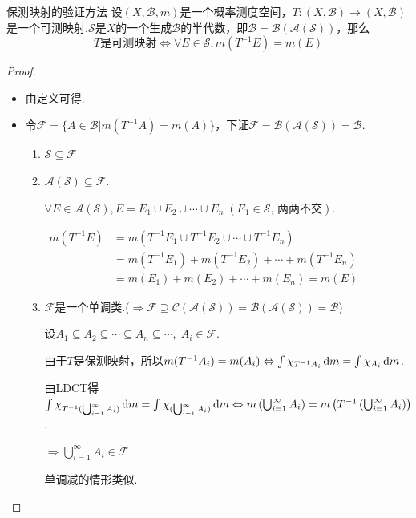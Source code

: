 \begin{theorem}{保测映射的验证方法}
    设$(X,\mathcal{B},m)$是一个概率测度空间，$T:(X,\mathcal{B}) \to (X,\mathcal{B})$是一个可测映射.$\mathcal{S}$是$X$的一个生成$\mathcal{B}$的半代数，即$\mathcal{B}=\mathcal{B}(\mathcal{A}(\mathcal{S}))$，那么
    \[ T\text{是可测映射} \Longleftrightarrow \forall E \in \mathcal{S},m(T^{-1}E) = m(E) \]
\end{theorem}
\begin{proof}
    \begin{itemize}[leftmargin = 3.5em]
        \item[“$\Rightarrow$”] 由定义可得.
        \item[“$\Leftarrow$”] 令$\mathcal{F} = \{A\in\mathcal{B}|m(T^{-1}A)=m(A)\}$，下证$\mathcal{F}=\mathcal{B}(\mathcal{A}(\mathcal{S}))=\mathcal{B}$.\par
        \begin{enumerate}[leftmargin=0em,label=(\roman*)]
            \item $\mathcal{S}\subseteq\mathcal{F}$
            \item $\mathcal{A}(\mathcal{S})\subseteq\mathcal{F}$.\par
            $\forall E\in\mathcal{A}(\mathcal{S}),E=E_1\cup E_2\cup\cdots\cup E_n \;(E_1\in\mathcal{S},\,\text{两两不交})$.\par
            $\begin{aligned}
                m(T^{-1}E) &= m(T^{-1}E_1\cup T^{-1}E_2\cup\cdots\cup T^{-1}E_n)\\
                &=m(T^{-1}E_1)+m(T^{-1}E_2)+\cdots+m(T^{-1}E_n)\\
                &=m(E_1)+m(E_2)+\cdots+m(E_n)=m(E)
            \end{aligned}$\par
            \item $\mathcal{F}$是一个单调类.($\Rightarrow \mathcal{F}\supseteq\mathcal{C}(\mathcal{A}(\mathcal{S}))=\mathcal{B}(\mathcal{A}(\mathcal{S}))=\mathcal{B}$)\par
            设$A_1\subseteq A_2\subseteq \cdots\subseteq A_n\subseteq\cdots,\;A_i\in\mathcal{F}$.\par
            由于$T$是保测映射，所以$m(T^{-1}A_i)=m(A_i) \Leftrightarrow \int{\chi_{T^{-1}A_i}}\mathop{}\!\mathrm{d} m=\int {\chi_{A_i}}\mathop{}\!\mathrm{d} m$.\par
            由LDCT得$\int{\chi_{T^{-1}(\bigcup_{i=1}^\infty{A_i})}}\mathop{}\!\mathrm{d} m=\int{\chi_{(\bigcup_{i=1}^\infty{A_i})}}\mathop{}\!\mathrm{d} m \Leftrightarrow m\left(\bigcup_{i=1}^\infty{A_i}\right) = m\left(T^{-1}\left(\bigcup_{i=1}^\infty{A_i}\right)\right)$.\par
            $\Rightarrow \bigcup_{i=1}^\infty{A_i}\in\mathcal{F}$\par
            单调减的情形类似.
        \end{enumerate}
    \end{itemize}
\end{proof}

